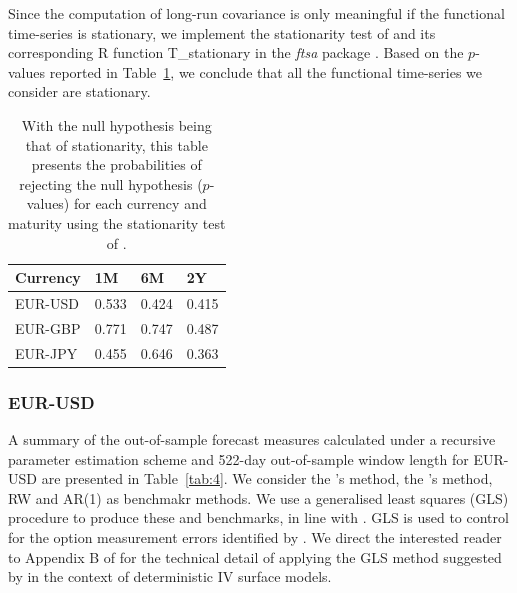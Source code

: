 \documentclass[12pt,a4paper]{article}
\begin{document}
Since the computation of long-run covariance is only meaningful if the functional time-series is stationary, we implement the stationarity test of \cite{HKR14} and its corresponding R function T\_stationary in the \textit{ftsa} package \citep{HS19}. Based on the $p$-values reported in Table~\ref{tab:3}, we conclude that all the functional time-series we consider are stationary.

\begin{table}[!htbp]
\tabcolsep 0.2in
\centering
\caption{\small{With the null hypothesis being that of stationarity, this table presents the probabilities of rejecting the null hypothesis ($p$-values) for each currency and maturity using the stationarity test of \cite{HKR14}.}}\label{tab:3}
\begin{tabular}{@{}llll@{}}
\toprule
Currency & 1M & 6M & 2Y \\
\midrule
EUR-USD & 0.533 & 0.424 & 0.415 \\
EUR-GBP & 0.771 & 0.747 & 0.487 \\
EUR-JPY & 0.455 & 0.646 & 0.363 \\
\bottomrule
\end{tabular}
\end{table}

\subsubsection{EUR-USD}

A summary of the out-of-sample forecast measures calculated under a recursive parameter estimation scheme and 522-day out-of-sample window length for EUR-USD are presented in Table~\ref{tab:4}. We consider the \citeauthor{CT11}'s \citeyearpar{CT11} method, the \citeauthor{GG06}'s \citeyearpar{GG06} method, RW and AR(1) as benchmakr methods. We use a generalised least squares (GLS) procedure to produce these \cite{GG06} and \cite{CT11} benchmarks, in line with \cite{BG14}. GLS is used to control for the option measurement errors identified by \cite{Hentschel03}. We direct the interested reader to Appendix B of \cite{GG06} for the technical detail of applying the GLS method suggested by \cite{Hentschel03} in the context of deterministic IV surface models.
\end{document}

